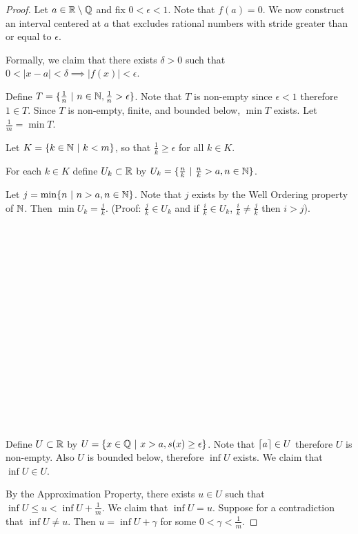 \documentclass[12pt]{article}
\begin{document}
\begin{proof}
  Let $a \in \mathbb{R}\setminus\mathbb{Q}$ and fix $0 < \epsilon < 1$. Note that $f(a) = 0$. We now construct an
  interval centered at $a$ that excludes rational numbers with stride greater than or equal to
  $\epsilon$.

  Formally, we claim that there exists $\delta > 0$ such that
  $0 < |x - a| < \delta \implies |f(x)| < \epsilon$.

  Define $T = \{\frac{1}{n} ~|~ n \in \mathbb{N}, \frac{1}{n} > \epsilon\}$. Note that $T$ is non-empty
  since $\epsilon < 1$ therefore $1 \in T$. Since $T$ is non-empty, finite, and bounded below,
  $\min T$ exists. Let $\frac{1}{m} = \min T$.

  Let $K = \{k \in \mathbb{N} ~|~ k < m\}$, so that $\frac{1}{k} \geq \epsilon$ for all $k \in K$.

  For each $k \in K$ define $U_k \subset \mathbb{R}$ by
  $U_k = \{\frac{n}{k} ~|~ \frac{n}{k} > a, n \in \mathbb{N}\}$.

  Let $j = \min \{n ~|~ n > a, n \in \mathbb{N}\}$. Note that $j$ exists by the Well Ordering property of
  $\mathbb{N}$. Then $\min U_k = \frac{j}{k}$. (Proof: $\frac{j}{k} \in U_k$ and if $\frac{i}{k} \in U_k$,
  $\frac{i}{k} \neq \frac{j}{k}$ then $i > j$).


  ~\\~\\~\\~\\~\\~\\~\\~\\~\\~\\~\\~\\~\\~\\~\\


  Define $U \subset \mathbb{R}$ by $U = \{x \in \mathbb{Q} ~|~ x > a, s(x) \geq \epsilon\}$. Note that
  $\lceil a\rceil\in U$ therefore $U$ is non-empty. Also $U$ is bounded below, therefore $\inf U$
  exists. We claim that $\inf U \in U$.

  By the Approximation Property, there exists $u \in U$ such that
  $\inf U \leq u < \inf U + \frac{1}{m}$. We claim that $\inf U = u$. Suppose for a contradiction
  that $\inf U \neq u$. Then $u = \inf U + \gamma$ for some $0 < \gamma < \frac{1}{m}$.
   \end{proof}
\end{document}
